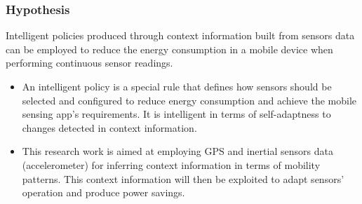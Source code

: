 \documentclass[compress,9pt,xcolor={dvipsnames,table}]{beamer}
\begin{document}
\begin{frame}\frametitle{Hypothesis}
\begin{tcolorbox}[title=Hypothesis,colframe=PineGreen]
Intelligent policies produced through context information built from sensors data can be employed to reduce the energy consumption in a mobile device when performing continuous sensor readings.
\end{tcolorbox}

{
\small
\begin{itemize}
  \item An intelligent policy is a special rule that defines how sensors should be selected and configured to reduce energy consumption and achieve the mobile sensing app's requirements.
  It is intelligent in terms of self-adaptness to changes detected in context information.
  \item This research work is aimed at employing GPS and inertial sensors data (accelerometer) for inferring context information in terms of mobility patterns.
  This context information will then be exploited to adapt sensors' operation and produce power savings.
\end{itemize}
}
\end{frame}
\end{document}
